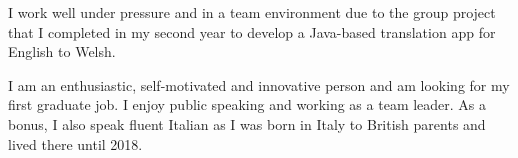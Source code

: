\documentclass[11pt, a4paper]{awesome-cv}
\begin{document}
\begin{cvletter}
I work well under pressure and in a team environment due to the group project that I completed in my second year to develop a Java-based translation app for English to Welsh. 

I am an enthusiastic, self-motivated and innovative person and am looking for my first graduate job. I enjoy public speaking and working as a team leader. As a bonus, I also speak fluent Italian as I was born in Italy to British parents and lived there until 2018. 


\end{cvletter}


\makeletterclosing
\end{document}
